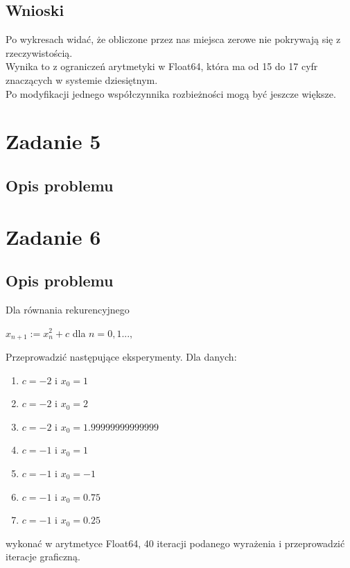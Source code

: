 \documentclass{article}
\begin{document}
\subsection*{Wnioski}
	Po wykresach widać, że obliczone przez nas miejsca zerowe nie pokrywają się z rzeczywistością. \\
	Wynika to z ograniczeń arytmetyki w Float64, która ma od 15 do 17 cyfr znaczących w systemie dziesiętnym. \\
	Po modyfikacji jednego współczynnika rozbieżności mogą być jeszcze większe.

\section*{Zadanie 5}
\subsection*{Opis problemu}

\section*{Zadanie 6}
\subsection*{Opis problemu}
	Dla równania rekurencyjnego \\
	\centerline{$x_{n+1} := x_n^2 + c$ dla $n = 0, 1...,$ \\}
	Przeprowadzić następujące eksperymenty. Dla danych:
	\begin{enumerate}
        \item $c = -2$ i $x_0 = 1$
        \item $c = -2$ i $x_0 = 2$
        \item $c = -2$ i $x_0 = 1.99999999999999$
        \item $c = -1$ i $x_0 = 1$
        \item $c = -1$ i $x_0 = -1$
        \item $c = -1$ i $x_0 = 0.75$
        \item $c = -1$ i $x_0 = 0.25$
    \end{enumerate}
    wykonać w arytmetyce Float64, 40 iteracji podanego wyrażenia i przeprowadzić iteracje graficzną.
\end{document}
